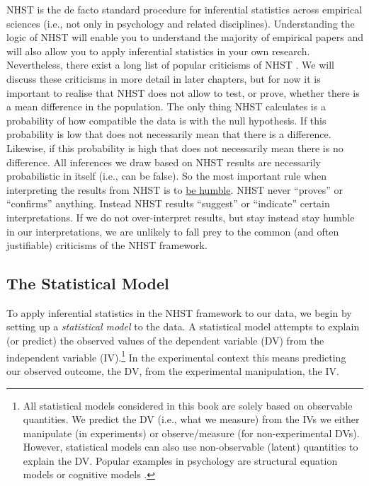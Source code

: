 \documentclass[
]{book}
\begin{document}
NHST is the de facto standard procedure for inferential statistics across empirical sciences (i.e., not only in psychology and related disciplines). Understanding the logic of NHST will enable you to understand the majority of empirical papers and will also allow you to apply inferential statistics in your own research. Nevertheless, there exist a long list of popular criticisms of NHST \citep[e.g.,][]{rozeboom1960, meehl1978, cohen1994, nickerson2000, wagenmakers2007}. We will discuss these criticisms in more detail in later chapters, but for now it is important to realise that NHST does not allow to test, or prove, whether there is a mean difference in the population. The only thing NHST calculates is a probability of how compatible the data is with the null hypothesis. If this probability is low that does not necessarily mean that there is a difference. Likewise, if this probability is high that does not necessarily mean there is no difference. All inferences we draw based on NHST results are necessarily probabilistic in itself (i.e., can be false). So the most important rule when interpreting the results from NHST is to \href{https://youtu.be/tvTRZJ-4EyI}{be humble}. NHST never ``proves'' or ``confirms'' anything. Instead NHST results ``suggest'' or ``indicate'' certain interpretations. If we do not over-interpret results, but stay instead stay humble in our interpretations, we are unlikely to fall prey to the common (and often justifiable) criticisms of the NHST framework.

\hypertarget{the-statistical-model}{%
\subsection{The Statistical Model}\label{the-statistical-model}}

To apply inferential statistics in the NHST framework to our data, we begin by setting up a \emph{statistical model} to the data. A statistical model attempts to explain (or predict) the observed values of the dependent variable (DV) from the independent variable (IV).\footnote{All statistical models considered in this book are solely based on observable quantities. We predict the DV (i.e., what we measure) from the IVs we either manipulate (in experiments) or observe/measure (for non-experimental DVs). However, statistical models can also use non-observable (latent) quantities to explain the DV. Popular examples in psychology are structural equation models \citep[e.g.,][]{kline2015} or cognitive models \citep[e.g.,][]{lee2013}.} In the experimental context this means predicting our observed outcome, the DV, from the experimental manipulation, the IV.
\end{document}

